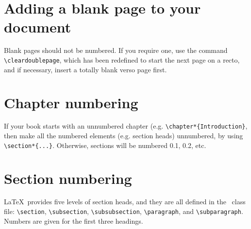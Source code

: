 \section{Adding a blank page to your document}

Blank pages should not be numbered. If you require one, use the command \verb"\cleardoublepage", which has been redefined to start the next page on a recto, and if necessary, insert a totally blank verso page first.



\section{Chapter numbering}
If your book starts with an unnumbered chapter (e.g. \verb"\chapter*{Introduction}", then make all the numbered elements (e.g. section heads) unnumbered, by using \verb"\section*{...}". Otherwise, sections will be numbered 0.1, 0.2, etc.

\section{Section numbering}

\LaTeX\ provides five levels of section heads, and they are all defined in the \cambridge\ class file: \verb"\section", \verb"\subsection", \verb"\subsubsection", \verb"\paragraph", and \verb"\subparagraph". Numbers are given for the first three headings.

